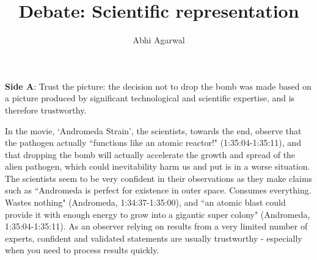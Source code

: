\documentclass[11pt, oneside]{article}
\title{Debate: Scientific representation\vspace{-0.4cm}}
\author{Abhi Agarwal\vspace{-1cm}}
\date{}
\begin{document}
\maketitle

\noindent \textbf{Side A}: Trust the picture: the decision not to drop the bomb was made based on a picture produced by significant technological and scientific expertise, and is therefore trustworthy.



\par In the movie, `Andromeda Strain', the scientists, towards the end, observe that the pathogen actually ``functions like an atomic reactor!" (1:35:04-1:35:11), and that dropping the bomb will actually accelerate the growth and spread of the alien pathogen, which could inevitability harm us and put is in a worse situation. The scientists seem to be very confident in their observations as they make claims such as ``Andromeda is perfect for existence in outer space. Consumes everything. Wastes nothing" (Andromeda, 1:34:37-1:35:00), and ``an atomic blast could provide it with enough energy to grow into a gigantic super colony" (Andromeda, 1:35:04-1:35:11). As an observer relying on results from a very limited number of experts, confident and validated statements are usually trustworthy - especially when you need to process results quickly.
\end{document}
